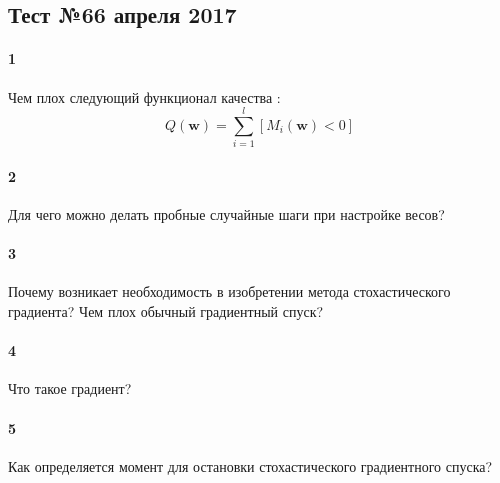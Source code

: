 \documentclass[a4paper,12pt]{article}
\begin{document}
  \subsection*{Тест №6\hfill{6 апреля 2017}}

  \paragraph{1} Чем плох следующий функционал качества :
  $$Q(\mathbf{w}) = \sum\limits_{i=1}^l \left[ M_i(\mathbf{w}) < 0 \right] $$
  
  \makebox[\linewidth]{\hrulefill}
  \makebox[\linewidth]{\hrulefill}
  
  \paragraph{2} Для чего можно делать пробные случайные шаги при настройке весов?
  
  \makebox[\linewidth]{\hrulefill}
  \makebox[\linewidth]{\hrulefill}

  \paragraph{3} Почему возникает необходимость в изобретении метода стохастического градиента? Чем плох обычный градиентный спуск?

  \makebox[\linewidth]{\hrulefill}
  \makebox[\linewidth]{\hrulefill}
  \makebox[\linewidth]{\hrulefill}

  \paragraph{4} Что такое градиент?
    
  \makebox[\linewidth]{\hrulefill}
  \makebox[\linewidth]{\hrulefill}
  \makebox[\linewidth]{\hrulefill}
  
  \paragraph{5} Как определяется момент для остановки стохастического градиентного спуска?

  \makebox[\linewidth]{\hrulefill}
  \makebox[\linewidth]{\hrulefill}
  \makebox[\linewidth]{\hrulefill}
  \makebox[\linewidth]{\hrulefill}
  
\end{document}
